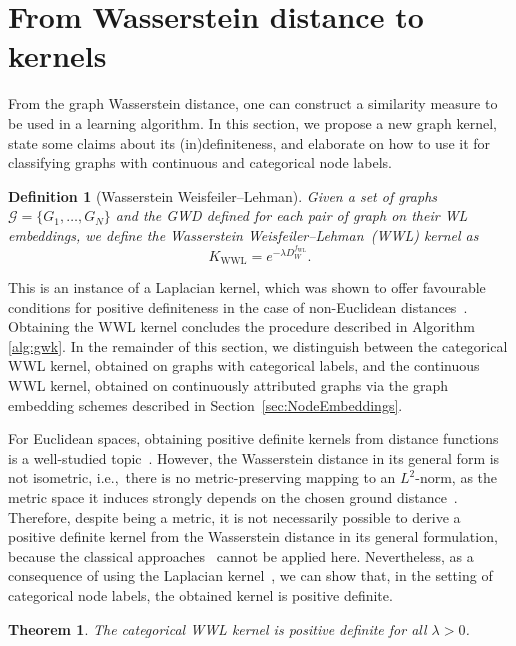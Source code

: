 \documentclass{article}
\newtheorem{definition}{Definition}
\newtheorem{theorem}{Theorem}
\begin{document}
\section{From Wasserstein distance to kernels}
\label{sec:kernels}



From the graph Wasserstein distance, one can construct a similarity measure to be used in a learning algorithm.
In this section, we propose a new graph kernel, state some claims about its (in)definiteness, and elaborate on how to use it for classifying graphs with continuous and categorical node labels.

\begin{definition}[Wasserstein Weisfeiler--Lehman]
\label{def:wwl}
Given a set of graphs $\mathcal{G} = \{G_1,\ldots, G_N\}$  and the GWD defined for each pair of graph on their WL embeddings, we define the Wasserstein Weisfeiler--Lehman~(WWL) kernel as 
\begin{equation}
    K_{\mathrm{\scriptscriptstyle{WWL}}} = e^{-\lambda D^{f_{\mathrm{\scriptscriptstyle{WL}}}}_W}.
\end{equation}
\end{definition}

This is an instance of a Laplacian kernel, which was shown to offer favourable conditions for positive definiteness in the case of non-Euclidean distances~\citep{feragen2015geodesic}. Obtaining the WWL kernel concludes the procedure described in Algorithm \ref{alg:gwk}. In the remainder of this section, we distinguish between the categorical WWL kernel, obtained on graphs with categorical labels, and the continuous WWL kernel, obtained on continuously attributed graphs via the graph embedding schemes described in Section~\ref{sec:NodeEmbeddings}.



For Euclidean spaces, obtaining positive definite kernels from distance functions is a well-studied topic~\citep{haasdonk2004learning}. 
However, the Wasserstein distance in its general form is not isometric, i.e.,\ there is no metric-preserving mapping to an $L^2$-norm, as the metric space it induces strongly depends on the chosen ground distance~\citep{figalli2011optimal}.
Therefore, despite being a metric, it is not necessarily possible to derive a positive definite kernel from the Wasserstein distance in its general formulation, because the classical approaches~\citep{haasdonk2004learning} cannot be applied here.
Nevertheless, as a consequence of using the Laplacian kernel~\citep{feragen2015geodesic}, we can show that, in the setting of categorical node labels, the obtained kernel is positive definite.
\begin{theorem}
The categorical WWL kernel is positive definite for all $\lambda > 0$.
\label{th:pd}
\end{theorem}
\end{document}
